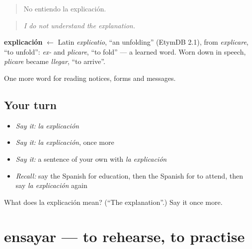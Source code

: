 \begin{quote}
No entiendo la explicación.
\end{quote}

\begin{quote}
\emph{I do not understand the explanation.}
\end{quote}

\begin{cousinweb}
\textbf{explicación} $\leftarrow$ Latin \emph{explicatio}, \textquotedblleft{}an unfolding\textquotedblright{} (EtymDB 2.1), from \emph{explicare}, \textquotedblleft{}to unfold\textquotedblright{}: \emph{ex-} and \emph{plicare}, \textquotedblleft{}to fold\textquotedblright{} — a learned word. Worn down in speech, \emph{plicare} became \emph{llegar}, \textquotedblleft{}to arrive\textquotedblright{}.
\end{cousinweb}

\begin{grammarlens}[title={What you've built}]
One more word for reading notices, forms and messages.
\end{grammarlens}

\subsection*{Your turn}
\begin{itemize}
\raggedright
  \item \emph{Say it:} \emph{la explicación}
  \item \emph{Say it:} \emph{la explicación}, once more
  \item \emph{Say it:} a sentence of your own with \emph{la explicación}
  \item \emph{Recall:} say the Spanish for education, then the Spanish for to attend, then say \emph{la explicación} again
\end{itemize}

\begin{tcolorbox}[breakable,colback=teal!4,colframe=teal!35!black,title={Before you move on}]
What does la explicación mean? (\textquotedblleft{}The explanation\textquotedblright{}.) Say it once more.
\end{tcolorbox}
\section[ensayar]{ensayar — to rehearse, to practise}

\label{lesson:ES-C505-ensayar}



